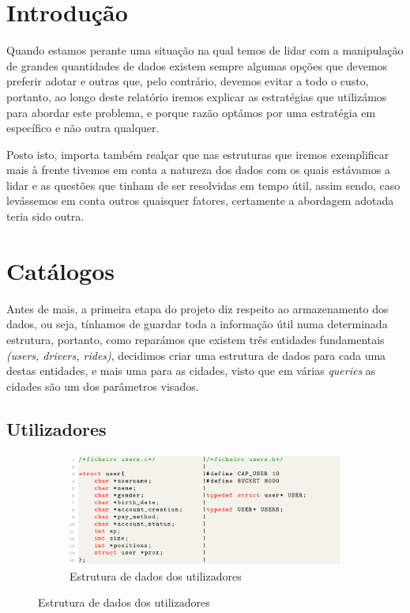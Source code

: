 \documentclass[12pt,a4paper]{report}
\begin{document}
\chapter{Introdução}

Quando estamos perante uma situação na qual temos de lidar com a manipulação de grandes quantidades de dados existem sempre algumas opções que devemos preferir adotar e outras que, pelo contrário, devemos evitar a todo o custo, portanto, ao longo deste relatório iremos explicar as estratégias que utilizámos para abordar este problema, e porque razão optámos por uma estratégia em específico e não outra qualquer.

Posto isto, importa também realçar que nas estruturas que iremos exemplificar mais à frente tivemos em conta a natureza dos dados com os quais estávamos a lidar e as questões que tinham de ser resolvidas em tempo útil, assim sendo, caso levássemos em conta outros quaisquer fatores, certamente a abordagem adotada teria sido outra.

\chapter{Catálogos}

Antes de mais, a primeira etapa do projeto diz respeito ao armazenamento dos dados, ou seja, tínhamos de guardar toda a informação útil numa determinada estrutura, portanto, como reparámos que existem três entidades fundamentais \textit{(users, drivers, rides)}, decidimos criar uma estrutura de dados para cada uma destas entidades, e mais uma para as cidades, visto que em várias \textit{queries} as cidades são um dos parâmetros visados.

\section{Utilizadores}

\begin{figure}[h]
    \centering
    \begin{subfigure}{\textwidth}
        \centering
        \includegraphics[width=1\linewidth]{images/users.png}
        \caption*{Estrutura de dados dos utilizadores}
        \label{fig:users}
    \end{subfigure}
\end{figure}
\end{document}
